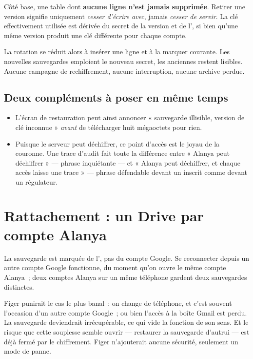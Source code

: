 \documentclass[11pt,a4paper,oneside]{report}
\begin{document}
Côté base, une table  dont
\textbf{aucune ligne n'est jamais supprimée}. Retirer une version signifie uniquement
\emph{cesser d'écrire avec}, jamais \emph{cesser de servir}. La clé effectivement utilisée
est dérivée du secret de la version et de l', si bien qu'une même version
produit une clé différente pour chaque compte.

La rotation se réduit alors à insérer une ligne et à la marquer courante. Les nouvelles
sauvegardes emploient le nouveau secret, les anciennes restent lisibles. Aucune campagne de
rechiffrement, aucune interruption, aucune archive perdue.

\subsection{Deux compléments à poser en même temps}

\begin{itemize}[leftmargin=*]
  \item {} L'écran de
        restauration peut ainsi annoncer « sauvegarde illisible, version de clé inconnue »
        \emph{avant} de télécharger huit mégaoctets pour rien.
  \item {} Puisque
        le serveur peut déchiffrer, ce point d'accès est le joyau de la couronne. Une trace
        d'audit fait toute la différence entre « Alanya peut déchiffrer » --- phrase
        inquiétante --- et « Alanya peut déchiffrer, et chaque accès laisse une trace »
        --- phrase défendable devant un inscrit comme devant un régulateur.
\end{itemize}

\section{Rattachement : un Drive par compte Alanya}

La sauvegarde est marquée de l', pas du compte Google. Se reconnecter depuis
un autre compte Google fonctionne, du moment qu'on ouvre le même compte Alanya~; deux
comptes Alanya sur un même téléphone gardent deux sauvegardes distinctes.

\begin{note}
Figer punirait le cas le plus banal~: on change de téléphone, et c'est souvent l'occasion
d'un autre compte Google~; ou bien l'accès à la boîte Gmail est perdu. La sauvegarde
deviendrait irrécupérable, ce qui vide la fonction de son sens. Et le risque que cette
souplesse semble ouvrir --- restaurer la sauvegarde d'autrui --- est déjà fermé par le
chiffrement. Figer n'ajouterait aucune sécurité, seulement un mode de panne.
\end{note}
\end{document}
